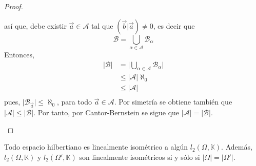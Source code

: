 \documentclass[12pt]{report}
\newcounter{it}
\theoremstyle{largebreak}
\newcommand\abs[1]{\ensuremath{\big|#1\big|}}
\newcommand\pint[2]{\ensuremath{\left(#1\big| #2\right)}}
\begin{document}
\begin{proof}
\begin{enumerate}
            así que, debe existir $\vec{a}\in\mathcal{A}$ tal que $\pint{\vec{b}}{\vec{a}}\neq0$, es decir que
            \begin{equation*}
                \mathcal{B}=\bigcup_{\alpha\in\mathcal{A}}\mathcal{B}_\alpha
            \end{equation*}
            Entonces,
            \begin{equation*}
                \begin{split}
                    \abs{\mathcal{B}}&=\abs{\bigcup_{\alpha\in\mathcal{A}}\mathcal{B}_\alpha}\\
                    &\leq\abs{\mathcal{A}}\aleph_0\\
                    &\leq\abs{\mathcal{A}}\\
                \end{split}
            \end{equation*}
            pues, $\abs{\mathcal{B}_{\vec{a}}}\leq\aleph_0$, para todo $\vec{a}\in\mathcal{A}$. Por simetría se obtiene también que $\abs{\mathcal{A}}\leq\abs{\mathcal{B}}$. Por tanto, por Cantor-Bernstein se sigue que $\abs{\mathcal{A}}=\abs{\mathcal{B}}$.
        \end{enumerate}
    \end{proof}

    \begin{theor}
        Todo espacio hilbertiano es linealmente isométrico a algún $l_2(\Omega,\mathbb{K})$. Además, $l_2(\Omega,\mathbb{K})$ y $l_2(\Omega',\mathbb{K})$ son linealmente isométricos si y sólo si $\abs{\Omega}=\abs{\Omega'}$.
    \end{theor}
\end{document}
